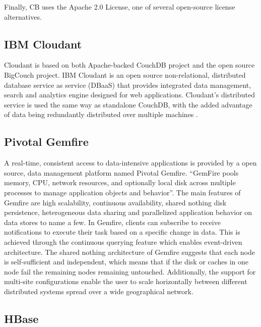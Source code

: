      Finally, CB uses the Apache 2.0 License, one of several
     open-source license alternatives. \cite{www-quora-cbs}

\subsection{IBM Cloudant}
     
     Cloudant is based on both Apache-backed CouchDB project and the
     open source BigCouch project. IBM Cloudant is an open source
     non-relational, distributed database service as service (DBaaS)
     that provides integrated data management, search and analytics 
     engine designed for web applications. Cloudant's distributed
     service is used the same way as standalone CouchDB, with the
     added advantage of data being redundantly distributed over
     multiple machines \cite{www-ibm-cloudant}.
   

\subsection{Pivotal Gemfire \cite{www-gemfire}}
     
     A real-time, consistent access to data-intensive applications is
     provided by a open source, data management platform named Pivotal
     Gemfire. ``GemFire pools memory, CPU, network resources, and
     optionally local disk across multiple processes to manage
     application objects and behavior''. The main features of Gemfire
     are high scalability, continuous availability, shared nothing
     disk persistence, heterogeneous data sharing and parallelized
     application behavior on data stores to name a few.  In Gemfire,
     clients can subscribe to receive notifications to execute their
     task based on a specific change in data. This is achieved through
     the continuous querying feature which enables event-driven
     architecture. The shared nothing architecture of Gemfire suggests
     that each node is self-sufficient and independent, which means
     that if the disk or caches in one node fail the remaining nodes
     remaining untouched. Additionally, the support for multi-site
     configurations enable the user to scale horizontally between
     different distributed systems spread over a wide geographical
     network.
     
\subsection{HBase}


